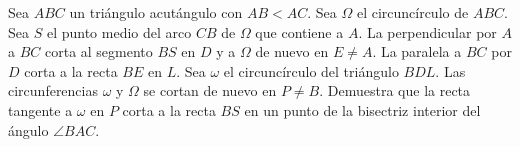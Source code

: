 Sea $ABC$ un triángulo acutángulo con $AB \lt AC$. Sea $\Omega$ el circuncírculo de $ABC$. Sea $S$ el punto medio del arco $CB$ de $\Omega$ que contiene a $A$. La perpendicular por $A$ a $BC$ corta al segmento $BS$ en $D$ y a $\Omega$ de nuevo en $E \neq A$. La paralela a $BC$ por $D$ corta a la recta $BE$ en $L$. Sea $\omega$ el circuncírculo del triángulo $BDL$. Las circunferencias $\omega$ y $\Omega$ se cortan de nuevo en $P \neq B$. Demuestra que la recta tangente a $\omega$ en $P$ corta a la recta $BS$ en un punto de la bisectriz interior del ángulo $\angle BAC$.
